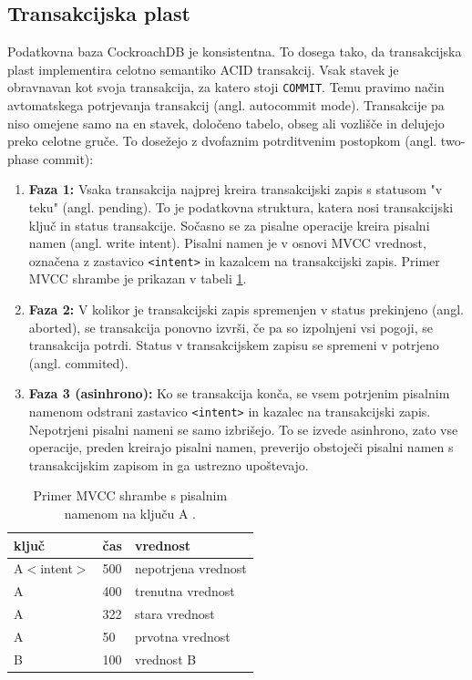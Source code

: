 \documentclass[a4paper, 12pt]{book}
\begin{document}
\subsection{Transakcijska plast}
Podatkovna baza CockroachDB je konsistentna. To dosega tako, da transakcijska plast implementira celotno semantiko ACID transakcij. Vsak stavek je obravnavan kot svoja transakcija, za katero stoji \texttt{COMMIT}. Temu pravimo način avtomatskega potrjevanja transakcij (angl. autocommit mode). Transakcije pa niso omejene samo na en stavek, določeno tabelo, obseg ali vozlišče in delujejo preko celotne gruče. To dosežejo z dvofaznim potrditvenim postopkom (angl. two-phase commit):

\begin{enumerate}
    \item \textbf{Faza 1:} Vsaka transakcija najprej kreira transakcijski zapis s statusom "v teku" (angl. pending). To je podatkovna struktura, katera nosi transakcijski ključ in status transakcije. Sočasno se za pisalne operacije kreira pisalni namen (angl. write intent). Pisalni namen je v osnovi MVCC vrednost, označena z zastavico \texttt{<intent>} in kazalcem na transakcijski zapis. Primer MVCC shrambe je prikazan v tabeli \ref{tbl_crdb_mvcc_store}.
    \item \textbf{Faza 2:} V kolikor je transakcijski zapis spremenjen v status prekinjeno (angl. aborted), se transakcija ponovno izvrši, če pa so izpolnjeni vsi pogoji, se transakcija potrdi. Status v transakcijskem zapisu se spremeni v potrjeno (angl. commited).
    \item \textbf{Faza 3 (asinhrono):} Ko se transakcija konča, se vsem potrjenim pisalnim namenom odstrani zastavico \texttt{<intent>} in kazalec na transakcijski zapis. Nepotrjeni pisalni nameni se samo izbrišejo. To se izvede asinhrono, zato vse operacije, preden kreirajo pisalni namen, preverijo obstoječi pisalni namen s transakcijskim zapisom in ga ustrezno upoštevajo.
\end{enumerate}

\begin{table}[H]
\begin{center}
\begin{tabular}{ l|l|l } 
\textbf{ključ} & \textbf{čas} & \textbf{vrednost} \\
\hline
A$<$intent$>$ & 500 & nepotrjena vrednost \\
A & 400 & trenutna vrednost \\ 
A & 322 & stara vrednost \\ 
A & 50 & prvotna vrednost \\
B & 100 & vrednost B \\
\end{tabular}
\end{center}
\caption{Primer MVCC shrambe s pisalnim namenom na ključu A \cite{CRDB-blog-transaction-isolation}.}
\label{tbl_crdb_mvcc_store}
\end{table}
\end{document}

